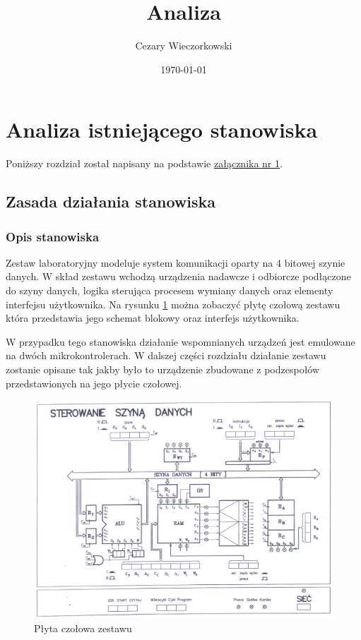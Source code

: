 \documentclass[../main.tex]{subfiles}
\author{Cezary Wieczorkowski}
\date{\today}
\title{Analiza}
\begin{document}
\section{Analiza istniejącego stanowiska}
Poniższy rozdział został napisany na podstawie \hyperref[zal:1]{załącznika nr 1}.   
\subsection{Zasada działania stanowiska}
    
    \subsubsection{Opis stanowiska}
        Zestaw laboratoryjny modeluje system komunikacji oparty na 4 bitowej szynie danych. W skład zestawu wchodzą urządzenia nadawcze i odbiorcze
        podłączone do szyny danych, logika sterująca procesem wymiany danych oraz elementy interfejsu użytkownika. Na rysunku \ref{fig:szyna_schemat} 
        można zobaczyć płytę czołową zestawu która przedstawia jego schemat blokowy oraz interfejs użytkownika. 
        \par
        W przypadku tego stanowiska działanie wspomnianych urządzeń jest emulowane na dwóch mikrokontrolerach. W dalszej części rozdziału
        działanie zestawu zostanie opisane tak jakby było to urządzenie zbudowane z podzespołów przedstawionych na jego płycie czołowej.

        \begin{figure}[H]
            \centering
            \includegraphics[width=\linewidth]{szyna_schemat.png}
            \caption{Płyta czołowa zestawu}
            \label{fig:szyna_schemat}
        \end{figure}
\end{document}

